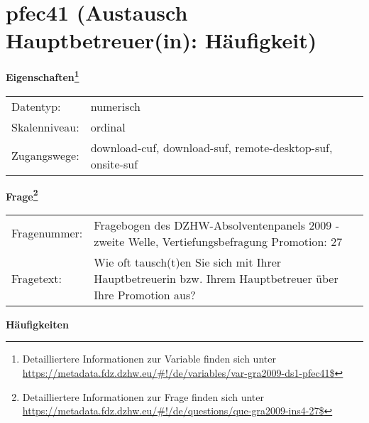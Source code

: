
    \setcounter{footnote}{0}

    \vspace*{-1.8cm}
	\section{pfec41 (Austausch Hauptbetreuer(in): Häufigkeit)}
	\label{section:pfec41}



    \vspace*{0.5cm}
    \noindent\textbf{Eigenschaften\footnote{Detailliertere Informationen zur Variable finden sich unter
		\url{https://metadata.fdz.dzhw.eu/\#!/de/variables/var-gra2009-ds1-pfec41$}}}\\
	\begin{tabularx}{\hsize}{@{}lX}
	Datentyp: & numerisch \\
	Skalenniveau: & ordinal \\
	Zugangswege: &
	  download-cuf, 
	  download-suf, 
	  remote-desktop-suf, 
	  onsite-suf
 \\
    \end{tabularx}



				\vspace*{0.5cm}
                \noindent\textbf{Frage\footnote{Detailliertere Informationen zur Frage finden sich unter
		              \url{https://metadata.fdz.dzhw.eu/\#!/de/questions/que-gra2009-ins4-27$}}}\\
				\begin{tabularx}{\hsize}{@{}lX}
					Fragenummer: &
					  Fragebogen des DZHW-Absolventenpanels 2009 - zweite Welle, Vertiefungsbefragung Promotion:
					  27
 \\
					Fragetext: & Wie oft tausch(t)en Sie sich mit Ihrer Hauptbetreuerin bzw. Ihrem Hauptbetreuer über Ihre Promotion aus? \\
				\end{tabularx}





        		\vspace*{0.5cm}
                \noindent\textbf{Häufigkeiten}

